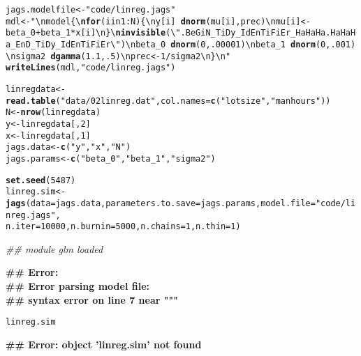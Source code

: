 \documentclass[12pt,letterpaper,oneside]{article}\usepackage{graphicx, color}
\makeatletter
\newcommand{\hlfunctioncall}[1]{\textcolor[rgb]{0.501960784313725,0,0.329411764705882}{\textbf{#1}}}%
\newcommand{\hlstring}[1]{\textcolor[rgb]{0.6,0.6,1}{#1}}%
\newenvironment{kframe}{%
 \def\at@end@of@kframe{}%
 \ifinner\ifhmode%
  \def\at@end@of@kframe{\end{minipage}}%
  \begin{minipage}{\columnwidth}%
 \fi\fi%
 \def\FrameCommand##1{\hskip\@totalleftmargin \hskip-\fboxsep
 \colorbox{shadecolor}{##1}\hskip-\fboxsep
     \hskip-\linewidth \hskip-\@totalleftmargin \hskip\columnwidth}%
 \MakeFramed {\advance\hsize-\width
   \@totalleftmargin\z@ \linewidth\hsize
   \@setminipage}}%
 {\par\unskip\endMakeFramed%
 \at@end@of@kframe}
\newenvironment{knitrout}{}{} %
\makeatother
\begin{document}
\begin{knitrout}\scriptsize
{}\color{fgcolor}\begin{kframe}
\begin{alltt}
jags.modelfile <- \hlstring{"code/linreg.jags"}
mdl <- \hlstring{"\textbackslash{}nmodel \{\textbackslash{}\hlfunctioncall{nfor} (i in 1:N) \{\textbackslash{}ny[i] ~ \hlfunctioncall{dnorm}(mu[i], prec)\textbackslash{}nmu[i] <- beta_0 + beta_1 * x[i]\textbackslash{}n\}\textbackslash{}\hlfunctioncall{ninvisible}(\textbackslash{}"}.BeGiN_TiDy_IdEnTiFiEr_HaHaHa.HaHaHa_EnD_TiDy_IdEnTiFiEr\textbackslash{}\hlstring{")\textbackslash{}nbeta_0 ~ \hlfunctioncall{dnorm}(0, .00001)\textbackslash{}nbeta_1 ~ \hlfunctioncall{dnorm}(0, .001)\textbackslash{}nsigma2 ~ \hlfunctioncall{dgamma}(1.1, .5)\textbackslash{}nprec <- 1/sigma2\textbackslash{}n\}\textbackslash{}n"}
\hlfunctioncall{writeLines}(mdl, \hlstring{"code/linreg.jags"})


linregdata <- \hlfunctioncall{read.table}(\hlstring{"data/02linreg.dat"}, col.names = \hlfunctioncall{c}(\hlstring{"lotsize"}, \hlstring{"manhours"}))
N <- \hlfunctioncall{nrow}(linregdata)
y <- linregdata[, 2]
x <- linregdata[, 1]
jags.data <- \hlfunctioncall{c}(\hlstring{"y"}, \hlstring{"x"}, \hlstring{"N"})
jags.params <- \hlfunctioncall{c}(\hlstring{"beta_0"}, \hlstring{"beta_1"}, \hlstring{"sigma2"})


\hlfunctioncall{set.seed}(5487)
linreg.sim <- \hlfunctioncall{jags}(data = jags.data, parameters.to.save = jags.params, model.file = \hlstring{"code/linreg.jags"}, 
    n.iter = 10000, n.burnin = 5000, n.chains = 1, n.thin = 1)
\end{alltt}


{\ttfamily\noindent\itshape\textcolor{messagecolor}{\#\# module glm loaded}}

{\ttfamily\noindent\bfseries\textcolor{errorcolor}{\#\# Error: \\\#\# Error parsing model file:\\\#\# syntax error on line 7 near """}}\begin{alltt}
linreg.sim
\end{alltt}


{\ttfamily\noindent\bfseries\textcolor{errorcolor}{\#\# Error: object 'linreg.sim' not found}}\end{kframe}
\end{knitrout}
\end{document}
